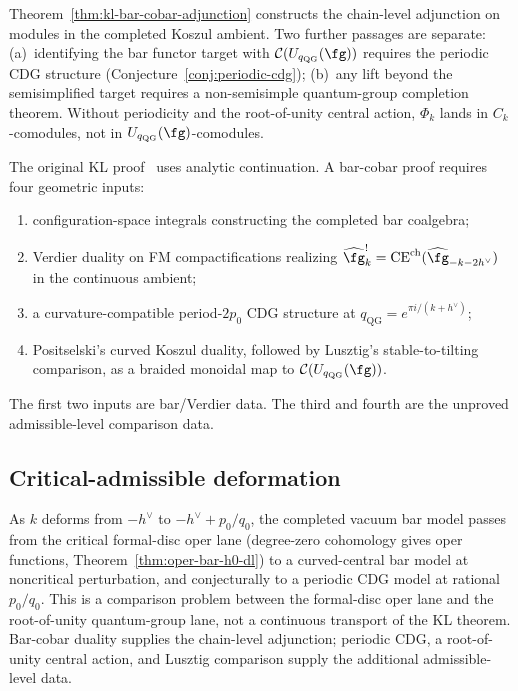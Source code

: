 \begin{remark}[Scope]\label{rem:kl-bar-cobar-scope}
Theorem~\ref{thm:kl-bar-cobar-adjunction} constructs the chain-level
adjunction on modules in the completed Koszul ambient. Two further
passages are separate:
(a)~identifying the bar functor target with $\mathcal{C}(U_{q_{\mathrm{QG}}}(\fg))$
requires the periodic CDG structure
(Conjecture~\ref{conj:periodic-cdg}); (b)~any lift beyond the
semisimplified target requires a non-semisimple quantum-group
completion theorem. Without periodicity and the root-of-unity central
action, $\Phi_k$ lands in $C_k$-comodules, not in
$U_{q_{\mathrm{QG}}}(\fg)$-comodules.
\end{remark}

\begin{remark}
\label{rem:geometric-proof-kl}
The original KL proof~\cite{KL93} uses analytic continuation.
A bar-cobar proof requires four geometric inputs:
\begin{enumerate}[label=\textup{(\arabic*)}]
\item configuration-space integrals constructing the completed bar
 coalgebra;
\item Verdier duality on FM compactifications realizing
 $\widehat{\fg}_k^! =
 \mathrm{CE}^{\mathrm{ch}}(\widehat{\fg}_{-k-2h^\vee})$ in the
 continuous ambient;
\item a curvature-compatible period-$2p_0$ CDG structure at
 $q_{\mathrm{QG}}=e^{\pi i/(k+h^\vee)}$;
\item Positselski's curved Koszul duality, followed by Lusztig's
 stable-to-tilting comparison, as a braided monoidal map to
 $\mathcal C(U_{q_{\mathrm{QG}}}(\fg))$.
\end{enumerate}
The first two inputs are bar/Verdier data. The third and fourth are
the unproved admissible-level comparison data.
\end{remark}


\subsection{Critical-admissible deformation}

\begin{remark}
\label{rem:critical-admissible}
As $k$ deforms from $-h^\vee$ to $-h^\vee + p_0/q_0$, the completed
vacuum bar model passes from the critical formal-disc oper lane
(degree-zero cohomology gives oper functions,
Theorem~\ref{thm:oper-bar-h0-dl}) to a curved-central bar model at
noncritical perturbation, and conjecturally to a periodic CDG model at
rational $p_0/q_0$. This is a comparison problem between the formal-disc
oper lane and the root-of-unity quantum-group lane, not a continuous
transport of the KL theorem. Bar-cobar duality supplies the
chain-level adjunction; periodic CDG, a root-of-unity central action,
and Lusztig comparison supply the additional admissible-level data.
\end{remark}



